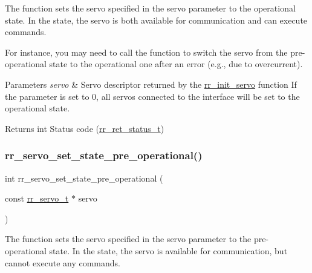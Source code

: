 The function sets the servo specified in the \textquotesingle{}servo\textquotesingle{} parameter to the operational state. In the state, the servo is both available for communication and can execute commands. 

For instance, you may need to call the function to switch the servo from the pre-\/operational state to the operational one after an error (e.\+g., due to overcurrent).


\begin{DoxyParams}{Parameters}
{\em servo} & Servo descriptor returned by the \hyperlink{group___common_ga0adb313a3eeb8a4399431e940a1f3e9e}{rr\+\_\+init\+\_\+servo} function If the parameter is set to 0, all servos connected to the interface will be set to the operational state. \\
\hline
\end{DoxyParams}
\begin{DoxyReturn}{Returns}
int Status code (\hyperlink{api_8h_a92d5be5038abcf89837faf85a08debdc}{rr\+\_\+ret\+\_\+status\+\_\+t}) 
\end{DoxyReturn}
\mbox{\label{group___system__control_ga39559219bfb36d4d9359365ac3656a74}} 
\subsubsection{\texorpdfstring{rr\+\_\+servo\+\_\+set\+\_\+state\+\_\+pre\+\_\+operational()}{rr\_servo\_set\_state\_pre\_operational()}}
{\footnotesize\ttfamily int rr\+\_\+servo\+\_\+set\+\_\+state\+\_\+pre\+\_\+operational (\begin{DoxyParamCaption}\item[{const \hyperlink{structrr__servo__t}{rr\+\_\+servo\+\_\+t} $\ast$}]{servo }\end{DoxyParamCaption})}



The function sets the servo specified in the \textquotesingle{}servo\textquotesingle{} parameter to the pre-\/operational state. In the state, the servo is available for communication, but cannot execute any commands. 


